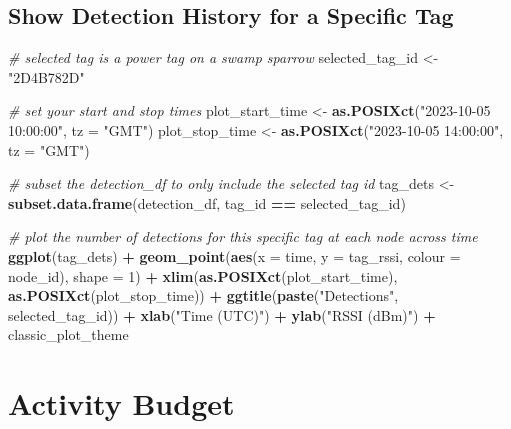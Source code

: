 \documentclass[
]{book}
\newenvironment{Shaded}{\begin{snugshade}}{\end{snugshade}}
\newcommand{\AttributeTok}[1]{\textcolor[rgb]{0.13,0.29,0.53}{#1}}
\newcommand{\CommentTok}[1]{\textcolor[rgb]{0.56,0.35,0.01}{\textit{#1}}}
\newcommand{\DecValTok}[1]{\textcolor[rgb]{0.00,0.00,0.81}{#1}}
\newcommand{\FunctionTok}[1]{\textcolor[rgb]{0.13,0.29,0.53}{\textbf{#1}}}
\newcommand{\NormalTok}[1]{#1}
\newcommand{\OtherTok}[1]{\textcolor[rgb]{0.56,0.35,0.01}{#1}}
\newcommand{\SpecialCharTok}[1]{\textcolor[rgb]{0.81,0.36,0.00}{\textbf{#1}}}
\newcommand{\StringTok}[1]{\textcolor[rgb]{0.31,0.60,0.02}{#1}}
\begin{document}
\section{Show Detection History for a Specific Tag}\label{show-detection-history-for-a-specific-tag}

\begin{Shaded}
\begin{Highlighting}[]
\CommentTok{\# selected tag is a power tag on a swamp sparrow}
\NormalTok{selected\_tag\_id }\OtherTok{\textless{}{-}} \StringTok{"2D4B782D"}

\CommentTok{\# set your start and stop times}
\NormalTok{plot\_start\_time }\OtherTok{\textless{}{-}} \FunctionTok{as.POSIXct}\NormalTok{(}\StringTok{"2023{-}10{-}05 10:00:00"}\NormalTok{, }\AttributeTok{tz =} \StringTok{"GMT"}\NormalTok{)}
\NormalTok{plot\_stop\_time }\OtherTok{\textless{}{-}} \FunctionTok{as.POSIXct}\NormalTok{(}\StringTok{"2023{-}10{-}05 14:00:00"}\NormalTok{, }\AttributeTok{tz =} \StringTok{"GMT"}\NormalTok{)}

\CommentTok{\# subset the detection\_df to only include the selected tag id}
\NormalTok{tag\_dets }\OtherTok{\textless{}{-}} \FunctionTok{subset.data.frame}\NormalTok{(detection\_df, tag\_id }\SpecialCharTok{==}\NormalTok{ selected\_tag\_id)}

\CommentTok{\# plot the number of detections for this specific tag at each node across time}
\FunctionTok{ggplot}\NormalTok{(tag\_dets) }\SpecialCharTok{+}
  \FunctionTok{geom\_point}\NormalTok{(}\FunctionTok{aes}\NormalTok{(}\AttributeTok{x =}\NormalTok{ time, }
                 \AttributeTok{y =}\NormalTok{ tag\_rssi, }
                 \AttributeTok{colour =}\NormalTok{ node\_id), }
             \AttributeTok{shape =} \DecValTok{1}\NormalTok{) }\SpecialCharTok{+}
  \FunctionTok{xlim}\NormalTok{(}\FunctionTok{as.POSIXct}\NormalTok{(plot\_start\_time), }
       \FunctionTok{as.POSIXct}\NormalTok{(plot\_stop\_time)) }\SpecialCharTok{+}
  \FunctionTok{ggtitle}\NormalTok{(}\FunctionTok{paste}\NormalTok{(}\StringTok{"Detections"}\NormalTok{, }
\NormalTok{                selected\_tag\_id)) }\SpecialCharTok{+}
  \FunctionTok{xlab}\NormalTok{(}\StringTok{"Time (UTC)"}\NormalTok{) }\SpecialCharTok{+}
  \FunctionTok{ylab}\NormalTok{(}\StringTok{"RSSI (dBm)"}\NormalTok{) }\SpecialCharTok{+}
\NormalTok{  classic\_plot\_theme}
\end{Highlighting}
\end{Shaded}

\chapter{Activity Budget}\label{activity-budget}
\end{document}
